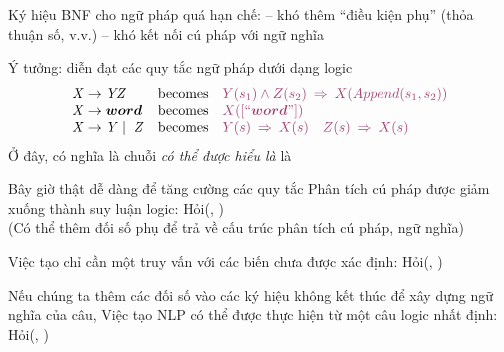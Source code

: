 \documentclass{article}
\begin{document}
\begin{huge}

Ký hiệu BNF cho ngữ pháp quá hạn chế:\al
-- khó thêm ``điều kiện phụ'' (thỏa thuận số, v.v.)\al
-- khó kết nối cú pháp với ngữ nghĩa

Ý tưởng: diễn đạt các quy tắc ngữ pháp dưới dạng logic
\[\begin{array}{lcl}
\bnf{X}\bnfeq\bnf{Y}\bnf{Z}        &\mbox{becomes} & \mat{Y(s_1) \land Z(s_2) \implies X(Append(s_1,s_2))} \\
\bnf{X}\bnfeq\bnft{word}           &\mbox{becomes} & \mat{X([\mbox{``}\bnft{word}\mbox{''}])} \\
\bnf{X}\bnfeq\bnf{Y}\bnfor \bnf{Z} &\mbox{becomes} & \mat{Y(s) \implies X(s)\quad Z(s) \implies X(s)}
\end{array}\]
Ở đây,  có nghĩa là chuỗi  \emph{ có thể được hiểu là } là 


Bây giờ thật dễ dàng để tăng cường các quy tắc
Phân tích cú pháp được giảm xuống thành suy luận logic:\al
  {\sc Hỏi}(, )\\
(Có thể thêm đối số phụ để trả về cấu trúc phân tích cú pháp, ngữ nghĩa)

Việc tạo chỉ cần một truy vấn với các biến chưa được xác định:\al
  {\sc Hỏi}(, )

Nếu chúng ta thêm các đối số vào các ký hiệu không kết thúc để xây dựng ngữ nghĩa của câu,
Việc tạo NLP có thể được thực hiện từ một câu logic nhất định:\al
  {\sc Hỏi}(, )







\end{huge}
\end{document}
